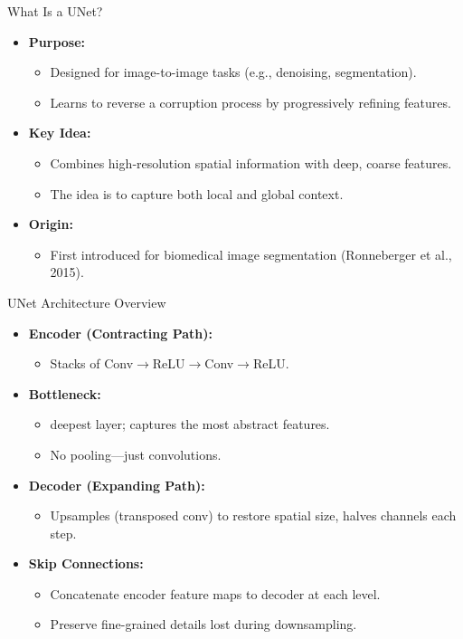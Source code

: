 \documentclass[11pt]{beamer}
\begin{document}
\begin{frame}{What Is a UNet?}
  \begin{itemize}
    \item \textbf{Purpose:}  
      \begin{itemize}
        \item Designed for image-to-image tasks (e.g., denoising, segmentation).
        \item Learns to reverse a corruption process by progressively refining features.
      \end{itemize}
    \item \textbf{Key Idea:}  
      \begin{itemize}
        \item Combines high‑resolution spatial information with deep, coarse features.
        \item The idea is to capture both local and global context.
      \end{itemize}
    \item \textbf{Origin:}  
      \begin{itemize}
        \item First introduced for biomedical image segmentation (Ronneberger et al., 2015).
      \end{itemize}
  \end{itemize}
\end{frame}

\begin{frame}{UNet Architecture Overview}
  \begin{itemize}
  \item \textbf{Encoder (Contracting Path):}
    \begin{itemize}
      \item Stacks of Conv$\rightarrow$ReLU$\rightarrow$Conv$\rightarrow$ReLU.
    \end{itemize}
  \item \textbf{Bottleneck:}
    \begin{itemize}
      \item deepest layer; captures the most abstract features.
      \item No pooling—just convolutions.
    \end{itemize}
  \item \textbf{Decoder (Expanding Path):}
    \begin{itemize}
      \item Upsamples (transposed conv) to restore spatial size, halves channels each step.
    \end{itemize}
  \item \textbf{Skip Connections:}
    \begin{itemize}
      \item Concatenate encoder feature maps to decoder at each level.
      \item Preserve fine-grained details lost during downsampling.
    \end{itemize}
\end{itemize}
\end{frame}
\end{document}
